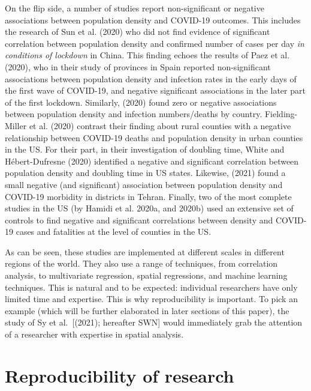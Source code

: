 \documentclass[]{elsarticle} %
\begin{document}
On the flip side, a number of studies report non-significant or negative
associations between population density and COVID-19 outcomes. This
includes the research of Sun et al. (2020) who did not find evidence of
significant correlation between population density and confirmed number
of cases per day \emph{in conditions of lockdown} in China. This finding
echoes the results of Paez et al. (2020), who in their study of
provinces in Spain reported non-significant associations between
population density and infection rates in the early days of the first
wave of COVID-19, and negative significant associations in the later
part of the first lockdown. Similarly, (2020) found zero or negative
associations between population density and infection numbers/deaths by
country. Fielding-Miller et al. (2020) contrast their finding about
rural counties with a negative relationship between COVID-19 deaths and
population density in urban counties in the US. For their part, in their
investigation of doubling time, White and Hébert-Dufresne (2020)
identified a negative and significant correlation between population
density and doubling time in US states. Likewise, (2021) found a small
negative (and significant) association between population density and
COVID-19 morbidity in districts in Tehran. Finally, two of the most
complete studies in the US (by Hamidi et al. 2020a, and 2020b) used an
extensive set of controls to find negative and significant correlations
between density and COVID-19 cases and fatalities at the level of
counties in the US.

As can be seen, these studies are implemented at different scales in
different regions of the world. They also use a range of techniques,
from correlation analysis, to multivariate regression, spatial
regressions, and machine learning techniques. This is natural and to be
expected: individual researchers have only limited time and expertise.
This is why reproducibility is important. To pick an example (which will
be further elaborated in later sections of this paper), the study of Sy
et al.~{[}(2021); hereafter SWN{]} would immediately grab the attention
of a researcher with expertise in spatial analysis.

\hypertarget{reproducibility-of-research}{%
\section{Reproducibility of
research}\label{reproducibility-of-research}}
\end{document}
